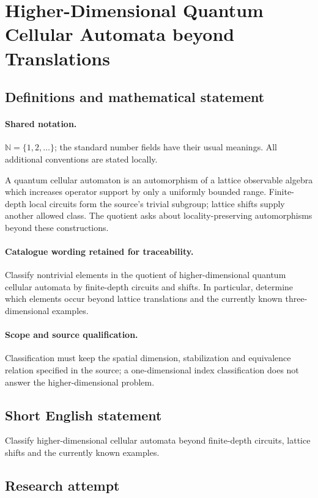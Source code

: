 \documentclass[11pt]{article}
\begin{document}
\section{Higher-Dimensional Quantum Cellular Automata beyond Translations}\label{statement}

\subsection{Definitions and mathematical statement}

\paragraph{Shared notation.}$\mathbb N=\{1,2,\ldots\}$; the standard number fields have their usual meanings. All additional conventions are stated locally.


A quantum cellular automaton is an automorphism of a lattice observable algebra which increases operator support by only a uniformly bounded range. Finite-depth local circuits form the source's trivial subgroup; lattice shifts supply another allowed class. The quotient asks about locality-preserving automorphisms beyond these constructions.

\paragraph{Catalogue wording retained for traceability.}
Classify nontrivial elements in the quotient of higher-dimensional quantum cellular automata by finite-depth circuits and shifts. In particular, determine which elements occur beyond lattice translations and the currently known three-dimensional examples.

\paragraph{Scope and source qualification.}Classification must keep the spatial dimension, stabilization and equivalence relation specified in the source; a one-dimensional index classification does not answer the higher-dimensional problem.
\subsection{Short English statement}
Classify higher-dimensional cellular automata beyond finite-depth circuits, lattice shifts and the currently known examples.
\subsection{Research attempt}
\end{document}
